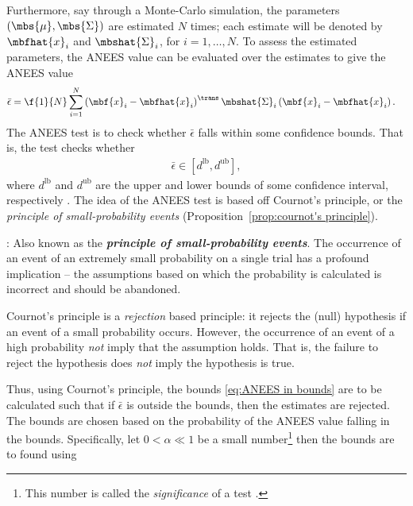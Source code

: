 \documentclass{simple-article}
\begin{document}
Furthermore, say through a Monte-Carlo simulation, the parameters $\left( \mbs{\mu}, \mbs{\Sigma} \right)$ are estimated $N$ times; each estimate will be denoted by $\mbfhat{x}_{i}$ and $\mbshat{\Sigma}_{i}$, for $i=1, \ldots, N$. To assess the estimated parameters, the ANEES value can be evaluated over the estimates to give the ANEES value
\begin{align}
  \bar{\epsilon} &= \f{1}{N}\sum_{i=1}^{N}\left( \mbf{x}_{i} - \mbfhat{x}_{i} \right)^{\trans}\mbshat{\Sigma}_{i}\left( \mbf{x}_{i} - \mbfhat{x}_{i} \right). 
\end{align}
The ANEES test is to check whether $\bar{\epsilon}$ falls within some confidence bounds. That is, the test checks whether 
\begin{align}
  \label{eq:ANEES in bounds}
  \bar{\epsilon}\in[d^{\mathrm{lb}}, d^{\mathrm{ub}}],
\end{align}
where $d^{\mathrm{lb}}$ and $d^{\mathrm{ub}}$ are the upper and lower bounds of some confidence interval, respectively \cite[pg.~235]{bar-shalomEstimationApplicationsTracking2004}. The idea of the ANEES test is based off Cournot's principle, or the \emph{principle of small-probability events} (Proposition~\ref{prop:cournot's principle}).
\begin{propositionBox}
  \label{prop:cournot's principle}
  \cite{liEvaluationEstimationAlgorithms2012, liCommonFallaciesApplying2008}: Also known as the \textbf{\emph{principle of small-probability events}}. The occurrence of an event of an extremely small probability on a single trial has a profound implication -- the assumptions based on which the probability is calculated is incorrect and should be abandoned. 
\end{propositionBox}
\begin{remarkBox}
  Cournot's principle is a \emph{rejection} based principle: it rejects the (null) hypothesis if an event of a small probability occurs. However, the occurrence of an event of a high probability \emph{not} imply that the assumption holds. That is, the failure to reject the hypothesis does \emph{not} imply the hypothesis is true.
\end{remarkBox}
Thus, using Cournot's principle, the bounds \eqref{eq:ANEES in bounds} are to be calculated such that if $\bar{\epsilon}$ is outside the bounds, then the estimates are rejected. The bounds are chosen based on the probability of the ANEES value falling in the bounds. Specifically, let $0<\alpha\ll 1$  be a small number\footnote{This number is called the \emph{significance} of a test \cite[p.~163]{wassermanAllStatisticsConcise2004}.} then the bounds are to found using
\end{document}
